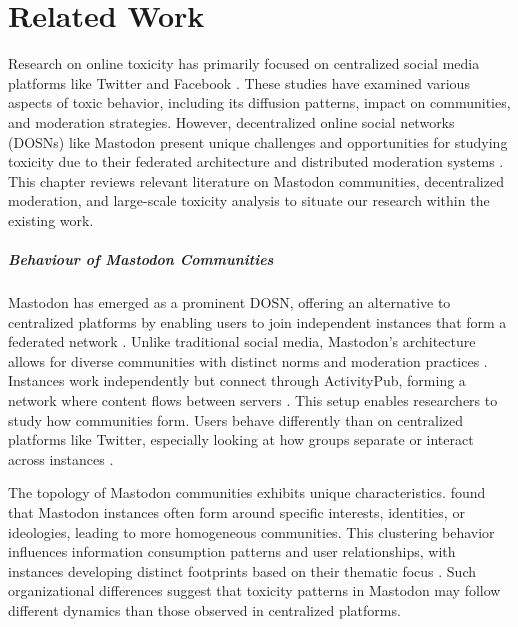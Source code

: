 \chapter{Related Work}

Research on online toxicity has primarily focused on centralized social media platforms like Twitter and Facebook \cite{fan:2022,nicholson:2023}. These studies have examined various aspects of toxic behavior, including its diffusion patterns, impact on communities, and moderation strategies. However, decentralized online social networks (DOSNs) like Mastodon present unique challenges and opportunities for studying toxicity due to their federated architecture and distributed moderation systems \cite{bono:2024}. This chapter reviews relevant literature on Mastodon communities, decentralized moderation, and large-scale toxicity analysis to situate our research within the existing work.

\paragraph{Behaviour of Mastodon Communities}
Mastodon has emerged as a prominent DOSN, offering an alternative to centralized platforms by enabling users to join independent instances that form a federated network \cite{zulli:2020}. Unlike traditional social media, Mastodon's architecture allows for diverse communities with distinct norms and moderation practices \cite{la_cava:2021}. Instances work independently but connect through ActivityPub, forming a network where content flows between servers \cite{mastodon:docs}. This setup enables researchers to study how communities form. Users behave differently than on centralized platforms like Twitter, especially looking at how groups separate or interact across instances \cite{zignani:2018}.

The topology of Mastodon communities exhibits unique characteristics. \citet{zulli:2020} found that Mastodon instances often form around specific interests, identities, or ideologies, leading to more homogeneous communities. This clustering behavior influences information consumption patterns and user relationships, with instances developing distinct footprints based on their thematic focus \cite{la_cava:2021}. Such organizational differences suggest that toxicity patterns in Mastodon may follow different dynamics than those observed in centralized platforms.

